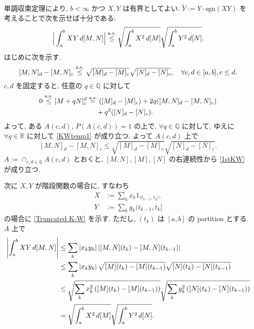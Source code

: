 \documentclass{ltjsarticle}
\begin{document}
\begin{prf}
	単調収束定理により, \( b < \infty \) かつ \( X,Y \) は有界としてよい.
	\( \tilde{Y} := Y \cdot \mathrm{sgn}(XY) \) を考えることで次を示せば十分である:
	\begin{equation}		\label{Truncated K-W}
		\Big| \int_a^b XY \, d[M,N] \Big| \stackrel{ \text{a.s.} }{ \le } 
		\sqrt{ \int_a^b X^2\,d[M] }\sqrt{ \int_a^b Y^2\, d[N] }.
	\end{equation}
	はじめに次を示す.
	\begin{equation}		\label{1stKW}
		[M,N]_d - [M,N]_c \stackrel{ \text{a.s.} }{ \le } \sqrt{[M]_d - [M]_c} \sqrt{[N]_d - [N]_c},
		\quad \forall c,d \in [a,b], c\le d.
	\end{equation}
	\( c,d \) を固定すると, 任意の \( q \in \mathbb{Q} \) に対して
	\begin{equation}		\label{KWtemp1}
		\begin{split}
			0 \stackrel{ \text{a.s.} }{ \le } [M+qN]_c^d	&\stackrel{ \text{a.s.} }{ = }	( [M]_d - [M]_c ) + 2q ( [M,N]_d - [M,N]_c )
			\\
			&	\quad \ +q^2 ( [N]_d - [N]_c ).
		\end{split}
	\end{equation}
	よって, ある \( A(c,d) \), \( P(A(c,d)) = 1 \) の上で, \( \forall q \in \mathbb{Q} \) に対して,
	ゆえに \( \forall q \in \mathbb{R} \) に対して \eqref{KWtemp1} が成り立つ.
	よって \( A(c,d) \) 上で
	\[	
		[M,N]_d - [M,N]_c \le \sqrt{[M]_d - [M]_c} \sqrt{[N]_d - [N]_c}.
	\]
	\( A := \cap_{c,d \in \mathbb{Q} } A(c,d) \) とおくと, \( [M,N], [M], [N] \) の右連続性から
	\eqref{1stKW} が成り立つ. 
	
	次に \( X, Y \) が階段関数の場合に, すなわち
	\begin{equation}		\label{StepApprox}
		\begin{split}
			X	&:= \sum_k x_k 1_{(t_{k-1},t_k]},
			\\
			Y	&:= \sum_k y_k {(t_{k-1},t_k]}
		\end{split}
	\end{equation}
	の場合に \eqref{Truncated K-W} を示す. ただし, \( (t_k) \) は \( [a,b] \) の partition とする.
	\( A \) 上で
	\begin{align}	\label{2ndKW}
		\left| \int_a^b XY \, d[M,N] \right|		
		 & \le	\sum_k \left| x_k y_k \right| \left| [M,N](t_k) - [M,N](t_{k-1}) \right|
		\notag                                                                           \\
		 & \le	\sum_k \left| x_k y_k \right| \sqrt{[M](t_k) - [M](t_{k-1})}
		\sqrt{[N](t_k) - [N](t_{k-1})}
		\notag                                                                           \\
		 & \le	\sqrt{ \sum_k x_k^2 \left( [M](t_k) - [M](t_{k-1}) \right) }
		\sqrt{ \sum_k y_k^2 \left( [N](t_k) - [N](t_{k-1}) \right) }
		\notag                                                                           \\
		 & =	\sqrt{ \int_a^b X^2\,d[M] } \sqrt{ \int_a^b Y^2\, d[N] }.
	\end{align}
	

\end{prf}
\end{document}
